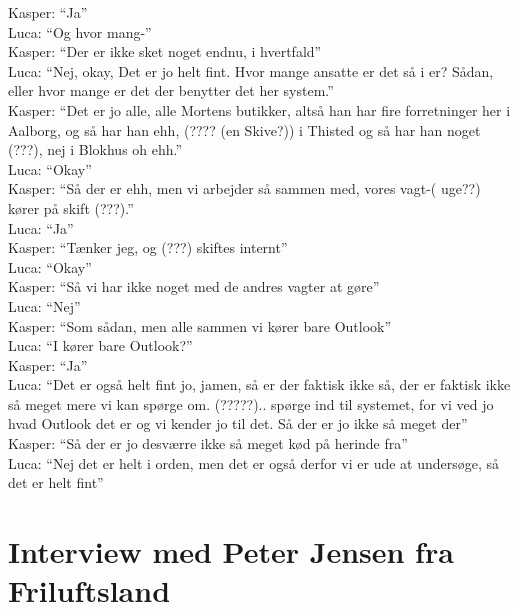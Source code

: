 Kasper: “Ja”\\
Luca: “Og hvor mang-”\\
Kasper: “Der er ikke sket noget endnu, i hvertfald”\\
Luca: “Nej, okay, Det er jo helt fint. Hvor mange ansatte er det så i er? Sådan, eller hvor mange er det der benytter det her system.”\\
Kasper: “Det er jo alle, alle Mortens butikker, altså han har fire forretninger her i Aalborg, og så har han ehh, (???? (en Skive?)) i Thisted og så har han noget (???), nej i Blokhus oh ehh.”\\
Luca: “Okay”\\
Kasper: “Så der er ehh, men vi arbejder så sammen med, vores vagt-( uge??) kører på skift (???).”\\
Luca: “Ja”\\
Kasper: “Tænker jeg, og (???) skiftes internt”\\
Luca: “Okay”\\
Kasper: “Så vi har ikke noget med de andres vagter at gøre”\\
Luca: “Nej”\\
Kasper: “Som sådan, men alle sammen vi kører bare Outlook”\\
Luca: “I kører bare Outlook?”\\
Kasper: “Ja”\\
Luca: “Det er også helt fint jo, jamen, så er der faktisk ikke så, der er faktisk ikke så meget mere vi kan spørge om. (?????).. spørge ind til systemet, for vi ved jo hvad Outlook det er og vi kender jo til det. Så der er jo ikke så meget der”\\
Kasper: “Så der er jo desværre ikke så meget kød på herinde fra”\\
Luca: “Nej det er helt i orden, men det er også derfor vi er ude at undersøge, så det er helt fint”\\


\section{Interview med Peter Jensen fra Friluftsland}\label{app:friluftsland}

